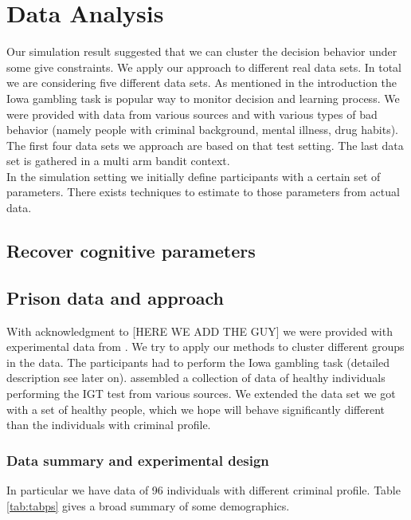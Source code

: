 \documentclass[12pt,a4paper,bibliography=totocnumbered,listof=totocnumbered]{scrartcl}
\begin{document}
\section{Data Analysis}

Our simulation result suggested that we can cluster the decision behavior under some give constraints. We apply our approach to different real data sets. In total we are considering five different data sets. As mentioned in the introduction the Iowa gambling task is popular way to monitor decision and learning process. We were provided with data from various sources and with various types of bad behavior (namely people with criminal background, mental illness, drug habits). The first four data sets we approach are based on that test setting. The last data set is gathered in a multi arm bandit context.\\
In the simulation setting we initially define participants with a certain set of parameters. There exists techniques to estimate to those parameters from actual data. 

\subsection{Recover cognitive parameters}


\subsection{Prison data and approach}

With acknowledgment to [HERE WE ADD THE GUY] we were provided with experimental data from \cite{Yechiam2008}. We try to apply our methods to cluster different groups in the data. The participants had to perform the Iowa gambling task (detailed description see later on). \cite{Steingroever2015} assembled a collection of data of healthy individuals performing the IGT test from various sources. We extended the data set we got with a set of healthy people, which we hope will behave significantly different than the individuals with criminal profile.

\subsubsection{Data summary and experimental design}

In particular we have data of 96 individuals with different criminal profile. Table \ref{tab:tabps} gives a broad summary of some demographics. 
\end{document}
